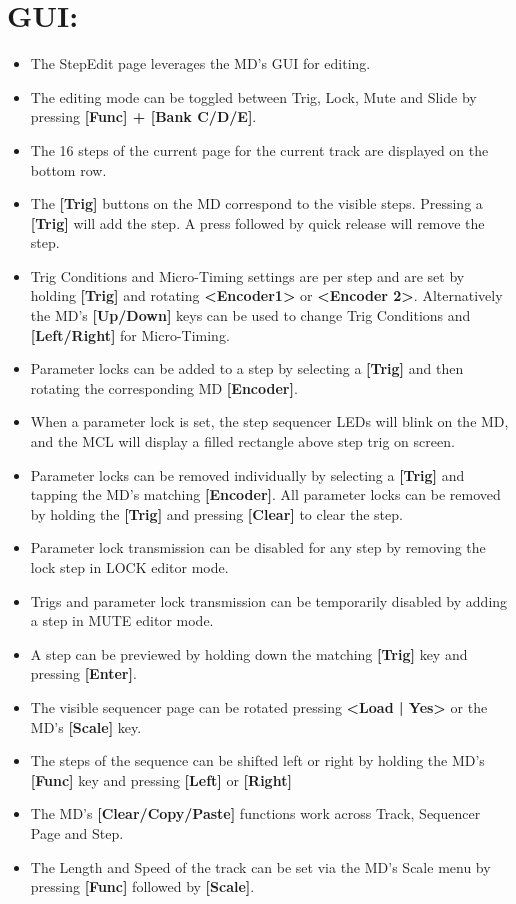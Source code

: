 \section{GUI:}
\begin{itemize}
\item The StepEdit page leverages the MD's GUI for editing.
\item The editing mode can be toggled between Trig, Lock, Mute and Slide by pressing \textbf{[Func] + [Bank C/D/E]}.
\item The 16 steps of the current page for the current track are displayed on the bottom row.
\item The \textbf{[Trig]} buttons on the MD correspond to the visible steps. Pressing a \textbf{[Trig]} will add the step. A press followed by quick release will remove the step. 
\item Trig Conditions and Micro-Timing settings are per step and are set by holding \textbf{[Trig]} and rotating \textbf{<Encoder1>} or \textbf{<Encoder 2>}. Alternatively the MD's \textbf{[Up/Down]} keys can be used to change Trig Conditions and \textbf{[Left/Right]} for Micro-Timing.
\item Parameter locks can be added to a step by selecting a \textbf{[Trig]} and then rotating the corresponding MD \textbf{[Encoder]}.
\item When a parameter lock is set, the step sequencer LEDs will blink on the MD, and the MCL will display a filled rectangle above step trig on screen.
\item Parameter locks can be removed individually by selecting a \textbf{[Trig]} and tapping the MD's matching \textbf{[Encoder]}. All parameter locks can be removed by holding the \textbf{[Trig]} and pressing \textbf{[Clear]} to clear the step.
\item Parameter lock transmission can be disabled for any step by removing the lock step in LOCK editor mode.
\item Trigs and parameter lock transmission can be temporarily disabled by adding a step in MUTE editor mode.
\item A step can be previewed by holding down the matching \textbf{[Trig]} key and pressing \textbf{[Enter]}.
\item The visible sequencer page can be rotated pressing \textbf{<Load | Yes>} or the MD's \textbf{[Scale]} key.
\item The steps of the sequence can be shifted left or right by holding the MD's \textbf{[Func]} key and pressing \textbf{[Left]} or \textbf{[Right]}
\item The MD's \textbf{[Clear/Copy/Paste]} functions work across Track, Sequencer Page and Step.
\item The Length and Speed of the track can be set via the MD's Scale menu by pressing
\textbf{[Func]} followed by \textbf{[Scale]}.

\end{itemize}
\newpage

